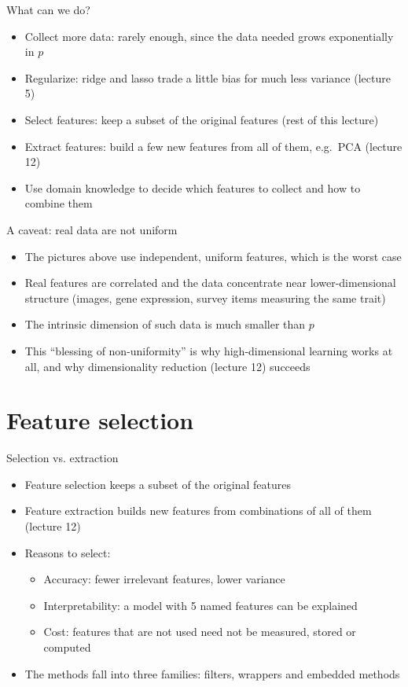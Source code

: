 \begin{frame}{What can we do?}
    \begin{itemize}
        \item Collect more data: rarely enough, since the data needed grows exponentially in $p$
        \item Regularize: ridge and lasso trade a little bias for much less variance (lecture 5)
        \item Select features: keep a subset of the original features (rest of this lecture)
        \item Extract features: build a few new features from all of them, e.g.\ PCA (lecture 12)
        \item Use domain knowledge to decide which features to collect and how to combine them
    \end{itemize}
\end{frame}

\begin{frame}{A caveat: real data are not uniform}
    \begin{itemize}
        \item The pictures above use independent, uniform features, which is the worst case
        \item Real features are correlated and the data concentrate near lower-dimensional structure (images, gene expression, survey items measuring the same trait)
        \item The intrinsic dimension of such data is much smaller than $p$
        \item This ``blessing of non-uniformity'' is why high-dimensional learning works at all, and why dimensionality reduction (lecture 12) succeeds
    \end{itemize}
\end{frame}


\section{Feature selection}

\begin{frame}{Selection vs. extraction}
    \begin{itemize}
        \item Feature selection keeps a subset of the original features
        \item Feature extraction builds new features from combinations of all of them (lecture 12)
        \item Reasons to select:
            \begin{itemize}
                \item Accuracy: fewer irrelevant features, lower variance
                \item Interpretability: a model with 5 named features can be explained
                \item Cost: features that are not used need not be measured, stored or computed
            \end{itemize}
        \item The methods fall into three families: filters, wrappers and embedded methods
    \end{itemize}
\end{frame}

